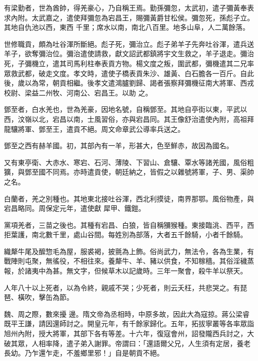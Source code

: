 \begin{pinyinscope}
 有梁勤者，世為酋帥，得羌豪心，乃自稱王焉。勤孫彌忽，太武初，遣子彌黃奉表求內附。太武嘉之，遣使拜彌忽為宕昌王，賜彌黃爵甘松侯。彌忽死，孫彪子立。其地自仇池以西，東西
 千里；席水以南，南北八百里。地多山阜，人二萬餘落。



 世修職貢，頗為吐谷渾所斷絕。彪子死，彌治立。彪子弟羊子先奔吐谷渾，遣兵送羊子，欲奪彌治位。彌治遣使請救，獻文詔武都鎮將宇文生救之，羊子退走。彌治死，子彌機立，遣其司馬利柱奉表貢方物。楊文度之叛，圍武都，彌機遣其二兄率眾救武都，破走文度。孝文時，遣使子橋表貢朱沙、雄黃、白石膽各一百斤。自此後，歲以為常，朝貢相繼。後孝文遣鴻臚劉歸、謁者張察拜彌機征南大將軍、西戎校尉、梁益二州牧、河南公、宕昌王。以助
 之。



 鄧至者，白水羌也，世為羌豪，因地名號，自稱鄧至。其地自亭街以東，平武以西，汶嶺以北，宕昌以南，士風習俗，亦與宕昌同。其王像舒治遣使內附，高祖拜龍驤將軍、鄧至王，遣貢不絕。周文命章武公導率兵送之。



 鄧至之西有赫羊國。初，其部內有一羊，形甚大，色至鮮赤，故因為國名。



 又有東亭衛、大赤水、寒宕、石河、薄陵、下習山、倉驤、覃水等諸羌國，風俗粗獷，與鄧至國不同焉。亦時遣貢使，朝廷納之，皆假之以雜號將軍，子、男、渠帥之名。



 白蘭者，羌之別種也。其地東北接吐谷渾，西北利摸徒，南界那鄂。風俗物產，與宕昌略同。周保定元年，遣使獻
 犀甲、鐵鎧。



 黨項羌者，三苗之後也。其種有宕昌、白狼，皆自稱獼猴種。東接臨洮、西平，西拒葉護，南北數千里，處山谷間。每姓別為部落，大者五千餘騎，小者千餘騎。



 織犛牛尾及醿惣毛為屋，服裘褐，披氈為上飾。俗尚武力，無法令，各為生業，有戰陣則屯聚，無徭役，不相往來。養犛牛、羊、豬以供食，不知稼穡。其俗淫穢蒸報，於諸夷中為甚。無文字，但候草木以記歲時。三年一聚會，殺牛羊以祭天。



 人年八十以上死者，以為令終，親戚不哭；少死者，則云夭枉，共悲哭之。有琵琶、橫吹，擊缶為節。



 魏、周之際，數來擾
 邊。隋文帝為丞相時，中原多故，因此大為寇掠。蔣公梁睿既平王謙，請因還師討之。開皇元年，有千餘家歸化。五年，拓拔寧叢等各率眾詣旭州內附，授大將軍，其部下各有等差。十六年，復寇會州，詔發隴西兵討之，大破其眾，人相率降，遣子弟入謝罪。帝謂曰：「還語爾父兄，人生須有定居，養老長幼。乃乍還乍走，不羞鄉里邪！」自是朝貢不絕。




\end{pinyinscope}
